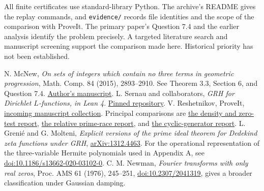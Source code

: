 \documentclass[11pt]{article}
\newcommand{\prior}[2]{\href{https://github.com/VladimirReshetnikov/ProveIt/blob/5cc267af75a635199ac5d93a7d49cbce521daefc/docs/incoming/#1}{#2}}
\begin{document}
All finite certificates use standard-library Python. The archive's README gives the replay commands, and \texttt{evidence/} records file identities and the scope of the comparison with ProveIt. The primary paper's Question 7.4 and the earlier analysis identify the problem precisely. A targeted literature search and manuscript screening support the comparison made here. Historical priority has not been established.
\begin{thebibliography}{9}
 N. McNew, \emph{On sets of integers which contain no three terms in geometric progression}, Math. Comp. 84 (2015), 2893--2910. See Theorem 3.3, Section 6, and Question 7.4. \href{https://www.nathanmcnew.com/GPFsets.pdf}{Author's manuscript}.
 L. Sernau and collaborators, \emph{GRH for Dirichlet $L$-functions, in Lean 4}. \href{https://github.com/lsernau/grh-lean/tree/72fead102f663d5c7a407964a13dc0cf9d977207}{Pinned repository}.
 V. Reshetnikov, ProveIt, \href{https://github.com/VladimirReshetnikov/ProveIt/tree/5cc267af75a635199ac5d93a7d49cbce521daefc/docs/incoming}{incoming manuscript collection}. Principal comparisons are \prior{grh_transfers_density_gaps_and_zero_tests.zip}{the density and zero-test report}, \prior{grh_relative_prime_races_2026-11-25.zip}{the relative prime-race report}, and \prior{grh_cyclic_generator_transfer_2026-11-25.zip}{the cyclic-generator report}.
 L. Greni\'e and G. Molteni, \emph{Explicit versions of the prime ideal theorem for Dedekind zeta functions under GRH}, \href{https://arxiv.org/abs/1312.4463}{arXiv:1312.4463}.
 For the operational representation of the three-variable Hermite polynomials used in Appendix A, see \href{https://doi.org/10.1186/s13662-020-03102-0}{doi:10.1186/s13662-020-03102-0}. C. M. Newman, \emph{Fourier transforms with only real zeros}, Proc. AMS 61 (1976), 245--251, \href{https://doi.org/10.2307/2041319}{doi:10.2307/2041319}, gives a broader classification under Gaussian damping.
\end{thebibliography}
\end{document}
